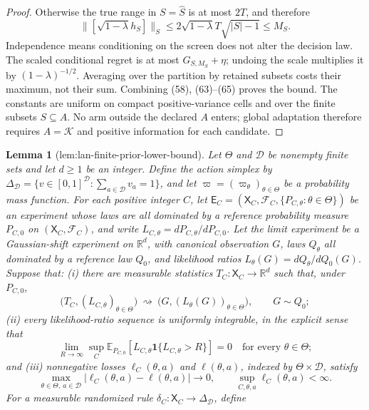 \documentclass{article}
\newtheorem{lemma}{Lemma}
\begin{document}
\begin{proof}
Otherwise the true range in \(S=\widehat S\) is at most \(2T\), and therefore
\[
\lVert[\sqrt{1-\lambda}h_S]\rVert_S
\leq2\sqrt{1-\lambda}T\sqrt{|S|-1}\leq M_S. \tag{65}
\]
Independence means conditioning on the screen does not alter the decision law.  The scaled conditional regret is at most \(G_{S,M_S}+\eta\); undoing the scale multiplies it by \((1-\lambda)^{-1/2}\).  Averaging over the partition by retained subsets costs their maximum, not their sum.  Combining (58), (63)--(65) proves the bound.  The constants are uniform on compact positive-variance cells and over the finite subsets \(S\subseteq A\).  No arm outside the declared \(A\) enters; global adaptation therefore requires \(A=\mathcal K\) and positive information for each candidate.
\end{proof}

\begin{lemma}[lem:lan-finite-prior-lower-bound]\label{lem:lan-finite-prior-lower-bound}
Let \(\Theta\) and \(\mathcal D\) be nonempty finite sets and let \(d\geq1\) be an integer.  Define the action simplex by \(\Delta_{\mathcal D}=\{v\in[0,1]^{\mathcal D}:\sum_{a\in\mathcal D}v_a=1\}\), and let \(\varpi=(\varpi_\theta)_{\theta\in\Theta}\) be a probability mass function.  For each positive integer \(C\), let \(\mathsf E_C=(\mathsf X_C,\mathcal F_C,\{P_{C,\theta}:\theta\in\Theta\})\) be an experiment whose laws are all dominated by a reference probability measure \(P_{C,0}\) on \((\mathsf X_C,\mathcal F_C)\), and write \(L_{C,\theta}=dP_{C,\theta}/dP_{C,0}\).  Let the limit experiment be a Gaussian-shift experiment on \(\mathbb R^d\), with canonical observation \(G\), laws \(Q_\theta\) all dominated by a reference law \(Q_0\), and likelihood ratios \(L_\theta(G)=dQ_\theta/dQ_0(G)\).  Suppose that: (i) there are measurable statistics \(T_C\colon\mathsf X_C\to\mathbb R^d\) such that, under \(P_{C,0}\),
\[
 \bigl(T_C,(L_{C,\theta})_{\theta\in\Theta}\bigr)
 \ \rightsquigarrow\ 
 \bigl(G,(L_\theta(G))_{\theta\in\Theta}\bigr),
 \qquad G\sim Q_0;
\]
(ii) every likelihood-ratio sequence is uniformly integrable, in the explicit sense that
\[
 \lim_{R\to\infty}\sup_C
 \mathbb E_{P_{C,0}}\!\left[L_{C,\theta}
 \mathbf 1\{L_{C,\theta}>R\}\right]=0
 \quad\text{for every }\theta\in\Theta;
\]
and (iii) nonnegative losses \(\ell_C(\theta,a)\) and \(\ell(\theta,a)\), indexed by \(\Theta\times\mathcal D\), satisfy
\[
 \max_{\theta\in\Theta,\ a\in\mathcal D}
 |\ell_C(\theta,a)-\ell(\theta,a)|\longrightarrow0,
 \qquad
 \sup_{C,\theta,a}\ell_C(\theta,a)<\infty.
\]
For a measurable randomized rule \(\delta_C\colon\mathsf X_C\to\Delta_{\mathcal D}\), define

\end{lemma}
\end{document}
